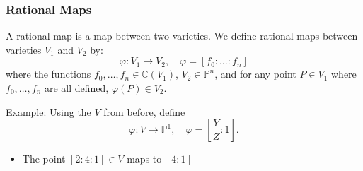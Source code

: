 \documentclass{beamer}
\theoremstyle{definition}
\begin{document}
\begin{frame}
    \frametitle{Rational Maps}
    A rational map is a map between two varieties. We define rational maps between varieties \(V_1\) and \(V_2\) by:
    \[\varphi : V_1 \to V_2, \quad \varphi = [f_0: \ldots: f_n]\] where the functions \(f_0, \ldots, f_n \in \mathbb{C}(V_1)\), \(V_2\in\mathbb{P}^n\), and for any point \(P\in V_1\) where \(f_0, \ldots, f_n\) are all defined, \(\varphi(P)\in V_2\).

    Example: Using the \(V\) from before, define \[\varphi: V \to \mathbb{P}^1, \quad \varphi = \left[ \frac{Y}{Z} : 1\right].\]
    \begin{itemize}
        \item[\textrightarrow] The point \([2 : 4 : 1]\in V\) maps to \(\left[4 : 1\right]\)
        
    \end{itemize}
   
\end{frame}
\end{document}
